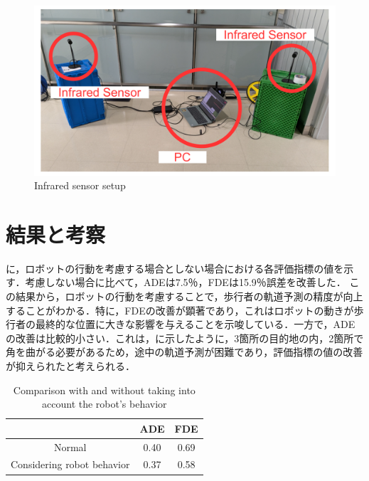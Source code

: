 \vspace{-20pt}

\begin{figure}[H]
  \centering
 \includegraphics[keepaspectratio, scale=0.32]
      {images/tracking-sensor.pdf}
\caption{Infrared sensor setup}
 \label{Fig:oculus-sensor}
\end{figure}

\vspace{-20pt}

\section{結果と考察}\label{sec:oculus-exp-result}
に，ロボットの行動を考慮する場合としない場合における各評価指標の値を示す．考慮しない場合に比べて，ADEは7.5％，FDEは15.9％誤差を改善した．
この結果から，ロボットの行動を考慮することで，歩行者の軌道予測の精度が向上することがわかる．特に，FDEの改善が顕著であり，これはロボットの動きが歩行者の最終的な位置に大きな影響を与えることを示唆している．一方で，ADEの改善は比較的小さい．これは，に示したように，3箇所の目的地の内，2箇所で角を曲がる必要があるため，途中の軌道予測が困難であり，評価指標の値の改善が抑えられたと考えられる．

\begin{table}[H]
  \begin{center}
  \caption{Comparison with and without taking into account the robot's behavior}
  \label{tab:robot-behavior}
  \begin{tabular}{c||c|c}
   & ADE & FDE \\ 
  \hline \hline
  Normal      & 0.40       & 0.69                      \\
  \hline
  Considering robot behavior    & 0.37       & 0.58                      \\
  \hline
  \end{tabular}
  \end{center}
\end{table}

